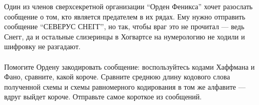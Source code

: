 \question
Один из членов сверхсекретной организации “Орден Феникса” хочет разослать сообщение о том, кто является предателем в их рядах. Ему нужно отправить сообщение “СЕВЕРУС СНЕГГ”, но так, чтобы враг это не прочитал — ведь Снегг, да и остальные слизеринцы в Хогвартсе на нумерологию не ходили и шифровку не разгадают.
\\
\\
Помогите Ордену закодировать сообщение: воспользуйтесь кодами Хаффмана и Фано, сравните, какой короче. Сравните среднюю длину кодового слова полученной схемы и схемы равномерного кодирования в том же алфавите — вдруг выйдет короче. Отправьте самое короткое из сообщений.